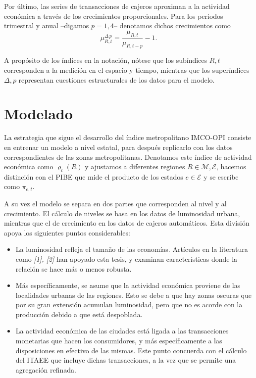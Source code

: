 \documentclass[]{article}
\begin{document}
Por último, las series de transacciones de cajeros aproximan a la
actividad económica a través de los crecimientos proporcionales. Para
los periodos trimestral y anual --digamos \(p = 1,4\)-- denotamos dichos
crecimientos como\\
\[ \mu_{R,t}^{\Delta\,p} = \frac{\mu_{R,t}}{\mu_{R,t-p}} - 1.\]

A propósito de los índices en la notación, nótese que los subíndices
\(R,t\) corresponden a la medición en el espacio y tiempo, mientras que
los superíndices \(\Delta, p\) representan cuestiones estructurales de
los datos para el modelo.

\section{Modelado}\label{modelado}

La estrategia que sigue el desarrollo del índice metropolitano IMCO-OPI
consiste en entrenar un modelo a nivel estatal, para después replicarlo
con los datos correspondientes de las zonas metropolitanas. Denotamos
este índice de actividad económica como \(\varrho_{t}(R)\) y ajustamos a
diferentes regiones \(R \in \mathcal M, \mathcal E\), hacemos distinción
con el PIBE que mide el producto de los estados \(e \in \mathcal E\) y
se escribe como \(\pi_{e,t}\).

A su vez el modelo se separa en dos partes que corresponden al nivel y
al crecimiento. El cálculo de niveles se basa en los datos de
luminosidad urbana, mientras que el de crecimiento en los datos de
cajeros automáticos. Esta división apoya los siguientes puntos
considerables:

\begin{itemize}
\item
  La luminosidad refleja el tamaño de las economías. Artículos en la
  literatura como \emph{{[}1{]}, {[}2{]}} han apoyado esta tesis, y
  examinan características donde la relación se hace más o menos
  robusta.
\item
  Más específicamente, se asume que la actividad económica proviene de
  las localidades urbanas de las regiones. Esto se debe a que hay zonas
  oscuras que por su gran extensión acumulan luminosidad, pero que no es
  acorde con la producción debido a que está despoblada.
\item
  La actividad económica de las ciudades está ligada a las transacciones
  monetarias que hacen los consumidores, y más específicamente a las
  disposiciones en efectivo de las mismas. Este punto concuerda con el
  cálculo del ITAEE que incluye dichas transacciones, a la vez que se
  permite una agregación refinada.
\end{itemize}
\end{document}
